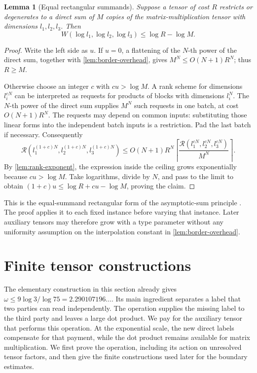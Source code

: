 \documentclass[11pt]{article}
\numberwithin{equation}{section}
\newtheorem{lemma}[theorem]{Lemma}
\theoremstyle{definition}
\theoremstyle{remark}
\begin{document}
\begin{lemma}[Equal rectangular summands]\label{lem:rectangular-sum}
Suppose a tensor of cost \(R\) restricts or degenerates to a direct sum
of \(M\) copies of the matrix-multiplication tensor with dimensions
\(l_1,l_2,l_3\).  Then
\begin{equation}\label{eq:rectangular-sum}
 W(\log l_1,\log l_2,\log l_3)\le \log R-\log M.
\end{equation}
\end{lemma}

\begin{proof}
Write the left side as \(u\).
If \(u=0\), a flattening of the \(N\)-th power of the direct sum,
together with \cref{lem:border-overhead}, gives
\(M^N\le O(N+1)R^N\); thus \(R\ge M\).

Otherwise choose an integer \(c\) with \(cu>\log M\).
A rank scheme for dimensions \(l_i^{cN}\) can be interpreted as requests
for products of blocks with dimensions \(l_i^N\).
The \(N\)-th power of the direct sum supplies \(M^N\) such requests in
one batch, at cost \(O(N+1)R^N\).
The requests may depend on common inputs: substituting those linear
forms into the independent batch inputs is a restriction.
Pad the last batch if necessary.  Consequently
\[
 \mathcal R(l_1^{(1+c)N},l_2^{(1+c)N},l_3^{(1+c)N})
 \le O(N+1)R^N
 \left\lceil
 \frac{\mathcal R(l_1^{cN},l_2^{cN},l_3^{cN})}{M^N}
 \right\rceil .
\]
By \cref{lem:rank-exponent}, the expression inside the ceiling grows
exponentially because \(cu>\log M\).
Take logarithms, divide by \(N\), and pass to the limit to obtain
\((1+c)u\le \log R+cu-\log M\), proving the claim.
\end{proof}

This is the equal-summand rectangular form of the asymptotic-sum
principle \cite{schonhage}.
The proof applies it to each fixed instance before varying that
instance.  Later auxiliary tensors may therefore grow with a type
parameter without any uniformity assumption on the interpolation
constant in \cref{lem:border-overhead}.

\section{Finite tensor constructions}
\label{alg:section}

The elementary construction in this section already gives
\(\omega\leq 9\log 3/\log 75=2.290107196\ldots\).
Its main ingredient separates a label that two parties can read independently.
The operation supplies the missing label to the third party and leaves a
large dot product.  We pay for the auxiliary tensor that performs this
operation.  At the exponential scale, the new direct labels compensate for
that payment, while the dot product remains available for matrix
multiplication.  We first prove the operation, including its action on
unresolved tensor factors, and then give the finite constructions used later
for the boundary estimates.
\end{document}
